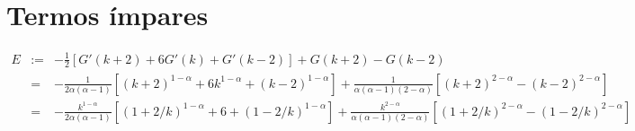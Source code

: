 \documentclass[10pt,a4paper]{article}%
\begin{document}





\newpage

\section{Termos ímpares}
    \begin{eqnarray*}
    E&:=&  -\frac{1}{2}\left[G'(k+2) + 6G'(k) + G'(k-2)\right] + G(k+2) - G(k-2)\\
    &=&-\frac{1}{2\alpha(\alpha-1)}\left[(k+2)^{1-\alpha} + 6k^{1-\alpha} + (k-2)^{1-\alpha}\right] + \frac{1}{\alpha(\alpha-1)(2-\alpha)}\left[(k+2)^{2-\alpha} - (k-2)^{2-\alpha}\right]\\
    &=&-\frac{k^{1-\alpha}}{2\alpha(\alpha-1)}\left[(1+2/k)^{1-\alpha} + 6 + (1-2/k)^{1-\alpha}\right] + \frac{k^{2-\alpha}}{\alpha(\alpha-1)(2-\alpha)}\left[(1+2/k)^{2-\alpha} - (1-2/k)^{2-\alpha}\right]\\
    \end{eqnarray*}
\end{document}
